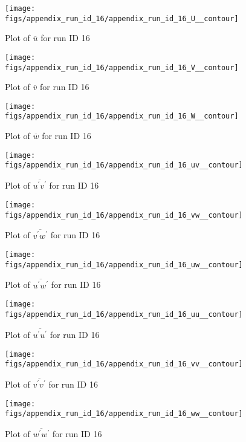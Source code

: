 \begin{figure}[H]
\centering
\texttt{[image: figs/appendix\_run\_id\_16/appendix\_run\_id\_16\_U\_\_contour]}
\caption{Plot of $\overline{u}$ for run ID 16}
\label{fig:appendix_run_id_16_U__contour}
\end{figure}


\begin{figure}[H]
\centering
\texttt{[image: figs/appendix\_run\_id\_16/appendix\_run\_id\_16\_V\_\_contour]}
\caption{Plot of $\overline{v}$ for run ID 16}
\label{fig:appendix_run_id_16_V__contour}
\end{figure}


\begin{figure}[H]
\centering
\texttt{[image: figs/appendix\_run\_id\_16/appendix\_run\_id\_16\_W\_\_contour]}
\caption{Plot of $\overline{w}$ for run ID 16}
\label{fig:appendix_run_id_16_W__contour}
\end{figure}


\begin{figure}[H]
\centering
\texttt{[image: figs/appendix\_run\_id\_16/appendix\_run\_id\_16\_uv\_\_contour]}
\caption{Plot of $\overline{u^\prime v^\prime}$ for run ID 16}
\label{fig:appendix_run_id_16_uv__contour}
\end{figure}


\begin{figure}[H]
\centering
\texttt{[image: figs/appendix\_run\_id\_16/appendix\_run\_id\_16\_vw\_\_contour]}
\caption{Plot of $\overline{v^\prime w^\prime}$ for run ID 16}
\label{fig:appendix_run_id_16_vw__contour}
\end{figure}


\begin{figure}[H]
\centering
\texttt{[image: figs/appendix\_run\_id\_16/appendix\_run\_id\_16\_uw\_\_contour]}
\caption{Plot of $\overline{u^\prime w^\prime}$ for run ID 16}
\label{fig:appendix_run_id_16_uw__contour}
\end{figure}


\begin{figure}[H]
\centering
\texttt{[image: figs/appendix\_run\_id\_16/appendix\_run\_id\_16\_uu\_\_contour]}
\caption{Plot of $\overline{u^\prime u^\prime}$ for run ID 16}
\label{fig:appendix_run_id_16_uu__contour}
\end{figure}


\begin{figure}[H]
\centering
\texttt{[image: figs/appendix\_run\_id\_16/appendix\_run\_id\_16\_vv\_\_contour]}
\caption{Plot of $\overline{v^\prime v^\prime}$ for run ID 16}
\label{fig:appendix_run_id_16_vv__contour}
\end{figure}


\begin{figure}[H]
\centering
\texttt{[image: figs/appendix\_run\_id\_16/appendix\_run\_id\_16\_ww\_\_contour]}
\caption{Plot of $\overline{w^\prime w^\prime}$ for run ID 16}
\label{fig:appendix_run_id_16_ww__contour}
\end{figure}


